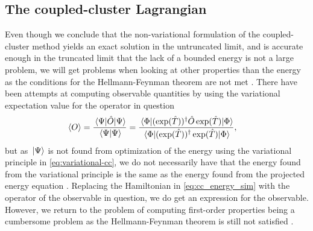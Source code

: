 
        \subsection{The coupled-cluster Lagrangian}
            Even though we conclude that the non-variational formulation of
            the coupled-cluster method yields an exact solution in the
            untruncated limit, and is accurate enough in the truncated limit
            that the lack of a bounded energy is not a large problem,
            we will get problems when looking at other properties than the
            energy as the conditions for the Hellmann-Feynman theorem are not
            met \cite{helgaker-molecular}.
            There have been attempts at computing observable quantities by using
            the variational expectation value for the operator in question
            \cite{exp-value-cizek, fink1974163}
            \begin{align}
                \expval{O}
                &= \frac{\mel*{\Psi}{\hat{O}}{\Psi}}{\braket*{\Psi}{\Psi}}
                = \frac{
                    \mel*{\slat}{
                        (\exponential(\clust))^{\dagger}
                        \hat{O}
                        \exponential(\clust)
                    }{\slat}
                }{
                    \mel*{\slat}{
                        (\exponential(\clust))^{\dagger}
                        \exponential(\clust)
                    }{\slat}
                },
            \end{align}
            but as $\ket*{\Psi}$ is not found from optimization of the energy
            using the variational principle in \autoref{eq:variational-cc}, we
            do not necessarily have that the energy found from the variational
            principle is the same as the energy found from the projected energy
            equation \cite{kvaal2013variational}.
            Replacing the Hamiltonian in \autoref{eq:cc_energy_sim} with the
            operator of the observable in question, we do get an expression for
            the observable.
            However, we return to the problem of computing first-order
            properties being a cumbersome problem as the Hellmann-Feynman
            theorem is still not satisfied \cite{helgaker-molecular,
            kvaal2013variational}.

